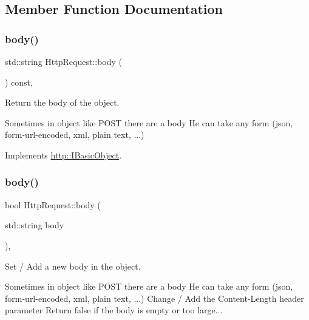 \subsection{Member Function Documentation}
\mbox{\label{classHttpRequest_a16be46a53c2d2f8d29ad89aa213f30bb}} 
\subsubsection{\texorpdfstring{body()}{body()}\hspace{0.1cm}{\footnotesize\ttfamily [1/2]}}
{\footnotesize\ttfamily std\+::string Http\+Request\+::body (\begin{DoxyParamCaption}{ }\end{DoxyParamCaption}) const\hspace{0.3cm}{\ttfamily [virtual]}, {\ttfamily [noexcept]}}



Return the body of the object. 

Sometimes in object like P\+O\+ST there are a body He can take any form (json, form-\/url-\/encoded, xml, plain text, ...) 

Implements \hyperlink{structhttp_1_1IBasicObject_a42eda0e62758f23d9d7d1fee01d8747a}{http\+::\+I\+Basic\+Object}.

\mbox{\label{classHttpRequest_a591fb5ec9430764ed5b3578d49c3858f}} 
\subsubsection{\texorpdfstring{body()}{body()}\hspace{0.1cm}{\footnotesize\ttfamily [2/2]}}
{\footnotesize\ttfamily bool Http\+Request\+::body (\begin{DoxyParamCaption}\item[{std\+::string}]{body }\end{DoxyParamCaption})\hspace{0.3cm}{\ttfamily [virtual]}, {\ttfamily [noexcept]}}



Set / Add a new body in the object. 

Sometimes in object like P\+O\+ST there are a body He can take any form (json, form-\/url-\/encoded, xml, plain text, ...) Change / Add the \textquotesingle{}Content-\/\+Length\textquotesingle{} header parameter Return false if the body is empty or too large... 

